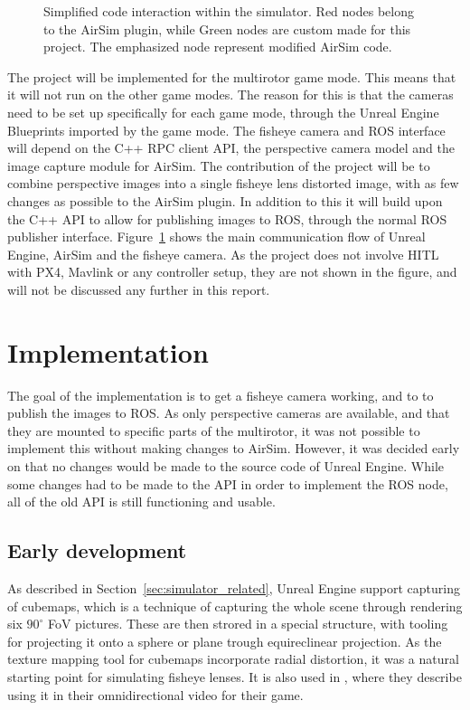 \begin{figure}[!htb]
\begin{tikzpicture}[node distance=2.2cm, transform shape, scale=0.7]
    \end{tikzpicture}
    \caption{Simplified code interaction within the simulator. Red nodes belong to the AirSim plugin, while Green nodes are custom made for this project. The emphasized node represent modified AirSim code.}
    \label{fig:comm_pattern}
\end{figure}

The project will be implemented for the multirotor game mode. This means that it will not run on the other game modes. The reason for this is that the cameras need to be set up specifically for each game mode, through the Unreal Engine Blueprints imported by the game mode. The fisheye camera and ROS interface will depend on the C++ RPC client API, the perspective camera model and the image capture module for AirSim. The contribution of the project will be to combine perspective images into a single fisheye lens distorted image, with as few changes as possible to the AirSim plugin. In addition to this it will build upon the C++ API to allow for publishing images to ROS, through the normal ROS publisher interface. Figure~\ref{fig:comm_pattern} shows the main communication flow of Unreal Engine, AirSim and the fisheye camera. As the project does not involve HITL with PX4, Mavlink or any controller setup, they are not shown in the figure, and will not be discussed any further in this report.

\section{Implementation}

The goal of the implementation is to get a fisheye camera working, and to to publish the images to ROS. As only perspective cameras are available, and that they are mounted to specific parts of the multirotor, it was not possible to implement this without making changes to AirSim. However, it was decided early on that no changes would be made to the source code of Unreal Engine. While some changes had to be made to the API in order to implement the ROS node, all of the old API is still functioning and usable.

\subsection{Early development} \label{sec:Early_dev}

As described in Section~\ref{sec:simulator_related}, Unreal Engine support capturing of cubemaps, which is a technique of capturing the whole scene through rendering six $90^\circ$ FoV pictures. These are then strored in a special structure, with tooling for projecting it onto a sphere or plane trough equireclinear projection. As the texture mapping tool for cubemaps incorporate radial distortion, it was a natural starting point for simulating fisheye lenses. It is also used in \cite{UnrealCubeCapture}, where they describe using it in their omnidirectional video for their game.

